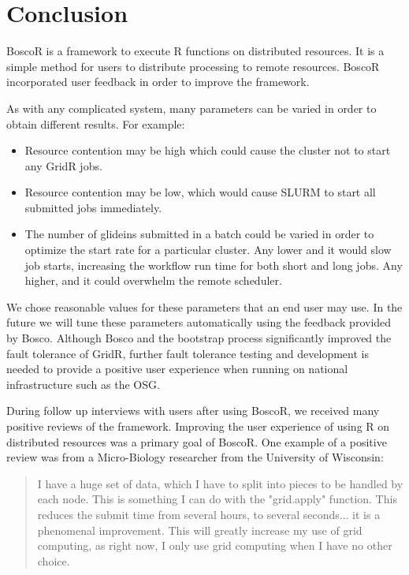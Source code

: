\documentclass[conference]{IEEEtran}
\begin{document}
\section{Conclusion}

BoscoR is a framework to execute R functions on distributed resources.  It is a simple method for users to distribute processing to remote resources.  BoscoR incorporated user feedback in order to improve the framework.

As with any complicated system, many parameters can be varied in order to obtain different results.  For example:
\begin{itemize}
\item Resource contention may be high which could cause the cluster not to start any GridR jobs.
\item Resource contention may be low, which would cause SLURM to start all submitted jobs immediately.
\item The number of glideins submitted in a batch could be varied in order to optimize the start rate for a particular cluster.  Any lower and it would slow job starts, increasing the workflow run time for both short and long jobs.  Any higher, and it could overwhelm the remote scheduler.
\end{itemize}

We chose reasonable values for these parameters that an end user may use.  In the future we will tune these parameters automatically using the feedback provided by Bosco.  Although Bosco and the bootstrap process significantly improved the fault tolerance of GridR, further fault tolerance testing and development is needed to provide a positive user experience when running on national infrastructure such as the OSG.

During follow up interviews with users after using BoscoR, we received many positive reviews of the framework.  Improving the user experience of using R on distributed resources was a primary goal of BoscoR.  One example of a positive review was from a Micro-Biology researcher from the University of Wisconsin:
\begin{quote}
I have a huge set of data, which I have to split into pieces to be handled by each node.  This is something I can do with the "grid.apply" function. This reduces the submit time from several hours, to several seconds... it is a  phenomenal improvement. This will greatly increase my use of grid computing, as right now, I only use grid computing when I have no other choice.
\end{quote}
\end{document}
